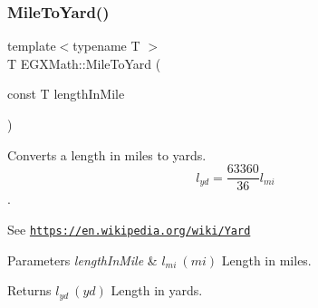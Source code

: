 \subsubsection{\texorpdfstring{Mile\+To\+Yard()}{MileToYard()}}
{\footnotesize\ttfamily template$<$typename T $>$ \\
T E\+G\+X\+Math\+::\+Mile\+To\+Yard (\begin{DoxyParamCaption}\item[{const T}]{length\+In\+Mile }\end{DoxyParamCaption})}



Converts a length in miles to yards. \[ l_{yd}= \frac{63360}{36} l_{mi} \]. 

See \href{https://en.wikipedia.org/wiki/Yard}{\tt https\+://en.\+wikipedia.\+org/wiki/\+Yard} 
\begin{DoxyParams}{Parameters}
{\em length\+In\+Mile} & $ l_{mi}\ (mi)$ Length in miles. \\
\hline
\end{DoxyParams}
\begin{DoxyReturn}{Returns}
$ l_{yd}\ (yd)$ Length in yards. 
\end{DoxyReturn}
